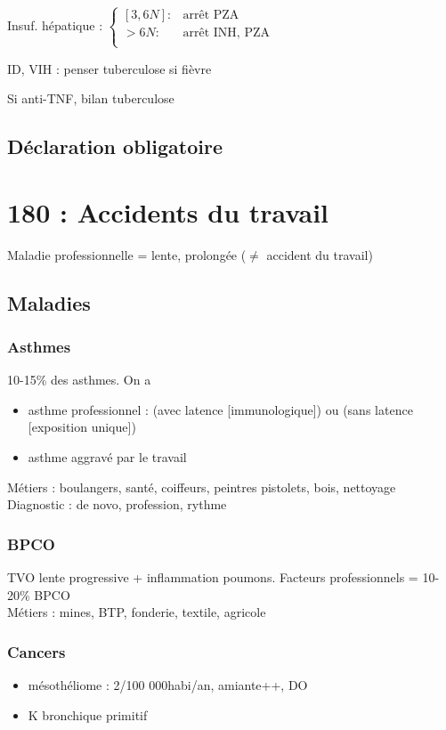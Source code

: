 \documentclass{article}
\begin{document}
Insuf. hépatique :
  $\begin{cases}
  [3,6N] : & \text{arrêt PZA}\\
  > 6N : & \text{arrêt INH, PZA}\\
\end{cases}$

ID, VIH : penser tuberculose si fièvre

Si anti-TNF, bilan tuberculose
\subsection{Déclaration obligatoire}

\section{180 : Accidents du travail}
Maladie professionnelle = lente, prolongée (\(\neq\) accident du travail)
\subsection{Maladies}
\subsubsection{Asthmes}
10-15\% des asthmes. On a
\begin{itemize}
\item asthme professionnel : (avec latence [immunologique]) ou (sans latence
  [exposition unique])
\item asthme aggravé par le travail
\end{itemize}
Métiers : boulangers, santé, coiffeurs, peintres pistolets, bois, nettoyage\\
Diagnostic : de novo, profession, rythme
\subsubsection{BPCO}
\gls{TVO} lente progressive + inflammation
poumons. Facteurs professionnels = 10-20\% BPCO\\
Métiers : mines, BTP, fonderie, textile, agricole
\subsubsection{Cancers}
\begin{itemize}
\item mésothéliome : 2/100 000habi/an, amiante++, DO
\item K bronchique primitif
\end{itemize}
\end{document}
